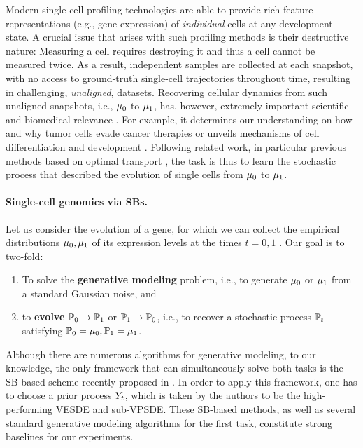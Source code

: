  Modern single-cell profiling technologies are able to provide rich feature representations (e.g., gene expression) of \textit{individual} cells at any development state. A crucial issue that arises with such profiling methods is their destructive nature: Measuring a cell requires destroying it and thus a cell cannot be measured twice. As a result, independent samples are collected at each snapshot, with no access to ground-truth single-cell trajectories throughout time, resulting in challenging, \emph{unaligned}, datasets.
Recovering cellular dynamics from such unaligned snapshots, i.e., $\mu_0$ to $\mu_1$, has, however, extremely important scientific and biomedical relevance \citep{kulkarni2019beyond}. For example, it determines our understanding on how and why tumor cells evade cancer therapies \citep{frangieh2021multimodal} or unveils mechanisms of cell differentiation and development \citep{schiebinger2019optimal}. Following related work, in particular previous methods based on optimal transport \citep{schiebinger2019optimal, bunne2021learning, bunne2022supervised, tong2020trajectorynet}, the task is thus to learn the stochastic process that described the evolution of single cells from $\mu_0$ to $\mu_1$.


\paragraph{Single-cell genomics via SBs.}
Let us consider the evolution of a gene, for which we can collect the empirical distributions $\mu_0,\mu_1$ of its expression levels at the times $t=0,1$ \citep{schiebinger2019optimal,moon2019visualizing}. Our goal is to two-fold: 
\begin{enumerate}[itemsep=.0cm,topsep=0cm]
\item To solve the \textbf{generative modeling} problem, i.e., to generate $\mu_0$ or $\mu_1$ from a standard Gaussian noise, and
\item to \textbf{evolve} $\mathbb{P}_{{0}}\to\mathbb{P}_{{1}}$ or $\mathbb{P}_{{1}}\to\mathbb{P}_{{0}}$, i.e., to recover a stochastic process $\mathbb{P}_{{t}}$ satisfying $\mathbb{P}_{{0}} = \mu_0, \mathbb{P}_{{1}} = \mu_1$.
\end{enumerate}


Although there are numerous algorithms for generative modeling, to our knowledge, the only framework that can simultaneously solve both tasks is the \acrshort{SB}-based scheme recently proposed in \citep{chen2021likelihood}. In order to apply this framework, one has to choose a prior process $Y_{ t }$, which is taken by the authors to be the high-performing \acrshort{VESDE} and sub-\acrshort{VPSDE}. These \acrshort{SB}-based methods, as well as several standard generative modeling algorithms \citep{ho2020denoising, sohl2015deep, song2020score, huang2021variational, song2019generative, song2020score} for the first task, constitute strong baselines for our experiments.

